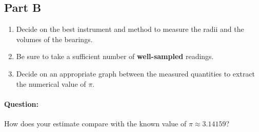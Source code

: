 \subsection{Part B}

\begin{enumerate}
    \item Decide on the best instrument and method to measure the radii and the volumes of the bearings.
    
    \item Be sure to take a sufficient number of \textbf{well-sampled} readings.
    
    \item Decide on an appropriate graph between the measured quantities to extract the numerical value of $\pi$.
\end{enumerate}

\begin{question}
\paragraph{Question:} How does your estimate compare with the known value of $\pi \approx 3.14159$?
\end{question}